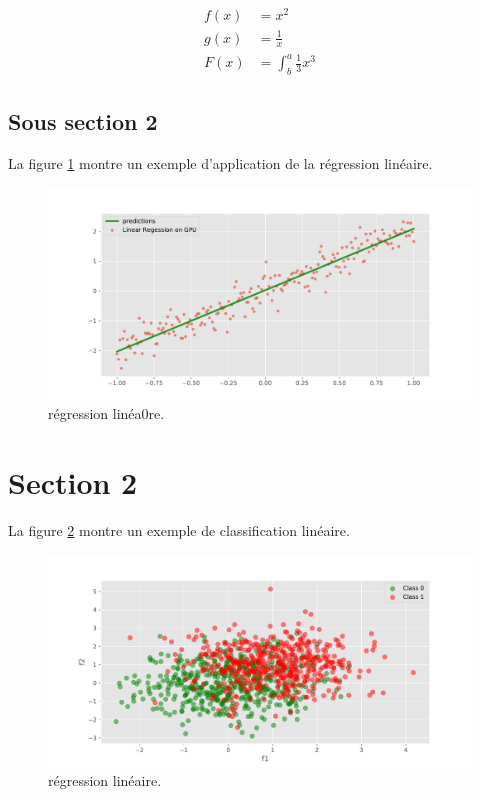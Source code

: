 \begin{align*}
  f(x) &= x^2\\
  g(x) &= \frac{1}{x}\\
  F(x) &= \int^a_b \frac{1}{3}x^3
\end{align*}


\subsection{Sous section 2}

La figure \ref{fig:linear_regression} montre un exemple d'application de la régression linéaire.

\begin{figure}[H]
	\includegraphics[width=1.0\textwidth,height=0.4\textheight]{Figures/chap1/linear_regression.eps}
	\caption{régression linéa0re.}
	\label{fig:linear_regression} 
\end{figure}


\section{Section 2}

La figure \ref{fig:logistic_regression} montre un exemple de classification linéaire.

\begin{figure}[H]
	\includegraphics[width=1.0\textwidth,height=0.4\textheight]{Figures/chap1/logistic_regression.eps}
	\caption{régression linéaire.}
	\label{fig:logistic_regression} 
\end{figure}

